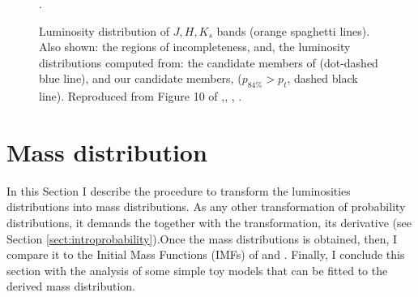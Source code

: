 \begin{figure}[htbp]
\begin{center}
\caption{Luminosity distribution of $J,H,K_s$ bands (orange spaghetti lines). Also shown: the regions of incompleteness, and, the luminosity distributions computed from: the candidate members of \citet{Bouy2015} (dot-dashed blue line), and our candidate members, ($p_{84\%}>p_t$, dashed black line). Reproduced from Figure 10 of \citet{Olivares2017},\textit{}, , .}
\label{fig:Luminosities}.
\end{center}
\end{figure}

\section{Mass distribution}

In this Section I describe the procedure to transform the luminosities distributions into mass distributions. As any other transformation of probability distributions, it demands the together with the transformation, its derivative (see Section \ref{sect:introprobability}).Once the mass distributions is obtained,  then, I compare it to the Initial Mass Functions (IMFs) of \citet{Chabrier2005} and \citet{Thies2007}. Finally, I conclude this section with the analysis of some simple toy models that can be fitted to the derived mass distribution.

